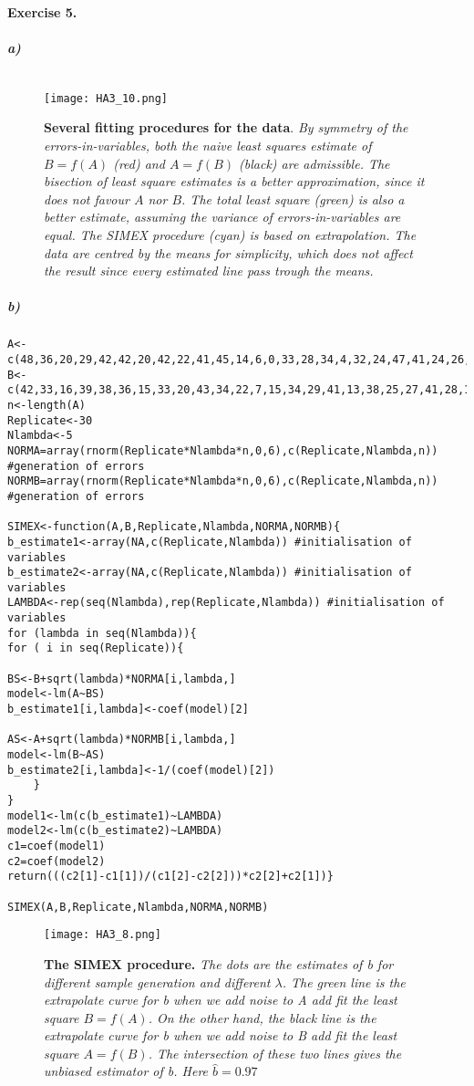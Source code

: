\documentclass{article}
\begin{document}
\paragraph{Exercise 5.}
\subparagraph{a)}
 $ $
\begin{figure}[H]
	  \centering
  	\texttt{[image: HA3\_10.png]}
  	\caption{\textbf{Several fitting procedures for the data}. \textsl{By symmetry of the errors-in-variables, both the naive least squares estimate of $B=f(A)$ (red) and $A=f(B)$ (black) are admissible. The bisection of least square estimates is a better approximation, since it does not favour $A$ nor $B$. The total least square (green) is also a better estimate, assuming the variance of errors-in-variables are equal. The SIMEX procedure (cyan) is based on extrapolation. The data are centred by the means for simplicity, which does not affect the result since every estimated line pass trough the means.}}
	\end{figure}
	
\subparagraph{b)}
\begin{footnotesize}
\begin{verbatim}
A<-c(48,36,20,29,42,42,20,42,22,41,45,14,6,0,33,28,34,4,32,24,47,41,24,26,30,41)
B<-c(42,33,16,39,38,36,15,33,20,43,34,22,7,15,34,29,41,13,38,25,27,41,28,14,28,40)
n<-length(A)
Replicate<-30
Nlambda<-5
NORMA=array(rnorm(Replicate*Nlambda*n,0,6),c(Replicate,Nlambda,n)) #generation of errors
NORMB=array(rnorm(Replicate*Nlambda*n,0,6),c(Replicate,Nlambda,n)) #generation of errors

SIMEX<-function(A,B,Replicate,Nlambda,NORMA,NORMB){
b_estimate1<-array(NA,c(Replicate,Nlambda)) #initialisation of variables
b_estimate2<-array(NA,c(Replicate,Nlambda)) #initialisation of variables
LAMBDA<-rep(seq(Nlambda),rep(Replicate,Nlambda)) #initialisation of variables
for (lambda in seq(Nlambda)){
for ( i in seq(Replicate)){

BS<-B+sqrt(lambda)*NORMA[i,lambda,]
model<-lm(A~BS)
b_estimate1[i,lambda]<-coef(model)[2]

AS<-A+sqrt(lambda)*NORMB[i,lambda,]
model<-lm(B~AS)
b_estimate2[i,lambda]<-1/(coef(model)[2])
	}
}
model1<-lm(c(b_estimate1)~LAMBDA)
model2<-lm(c(b_estimate2)~LAMBDA)
c1=coef(model1)
c2=coef(model2)
return(((c2[1]-c1[1])/(c1[2]-c2[2]))*c2[2]+c2[1])}

SIMEX(A,B,Replicate,Nlambda,NORMA,NORMB)
\end{verbatim}
\end{footnotesize}
\begin{figure}[H]
	  \centering
  	\texttt{[image: HA3\_8.png]}
  	\caption{\textbf{The SIMEX procedure.} \textsl{The dots are the estimates of b for different sample generation and different $\lambda$. The green line is the extrapolate curve for b when we add noise to A add fit the least square $B=f(A)$. On the other hand, the black line is the extrapolate curve for b when we add noise to B add fit the least square $A=f(B)$. The intersection of these two lines gives the unbiased estimator of b. Here $\widehat{b}=0.97$}}
	\end{figure}
\end{document}
